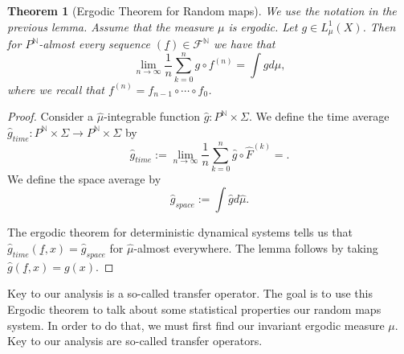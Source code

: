\documentclass[pdftex,11pt,a4paper,oneside]{article}
\theoremstyle{plain}
\newtheorem{theorem}{Theorem}[section]
\begin{document}
\begin{theorem}[Ergodic Theorem for Random maps]\label{theorem:ErgodicTheorem}
We use the notation in the previous lemma. Assume that the measure $\mu$ is ergodic. Let $g\in L^1_\mu(X)$. Then for $P^\mathbb{N}$-almost every sequence $(\underline{f})\in \mathcal{F}^\mathbb{N}$ we have that 
\[\lim_{n\to\infty} \frac{1}{n}\sum_{k=0}^n g\circ f^{(n)} = \int gd\mu,\]
where we recall that $f^{(n)} =f_{n-1}\circ\cdots\circ f_0 $.
\end{theorem}
\begin{proof}
Consider a $\hat{\mu}$-integrable function $\hat{g}:P^\mathbb{N}\times \Sigma$. We define the time average $\hat{g}_{time}:P^\mathbb{N}\times \Sigma\to P^\mathbb{N}\times \Sigma$ by
\[\hat{g}_{time} :=\lim_{n\to\infty} \frac{1}{n}\sum_{k=0}^n \hat{g}\circ\hat{F}^{(k)} = .\]
We define the space average by 
\[\hat{g}_{space} := \int \hat{g}d\hat{\mu}.\]

The ergodic theorem for deterministic dynamical systems tells us that $\hat{g}_{time}(\underline{f},x) = \hat{g}_{space}$ for $\hat{\mu}$-almost everywhere. The lemma follows by taking $\hat{g}(\underline{f},x) = g(x)$. 
\end{proof}


Key to our analysis is a so-called transfer operator. The goal is to use this Ergodic theorem to talk about some statistical properties our random maps system. In order to do that, we must first find our invariant ergodic measure $\mu$. Key to our analysis are so-called transfer operators.
\end{document}

